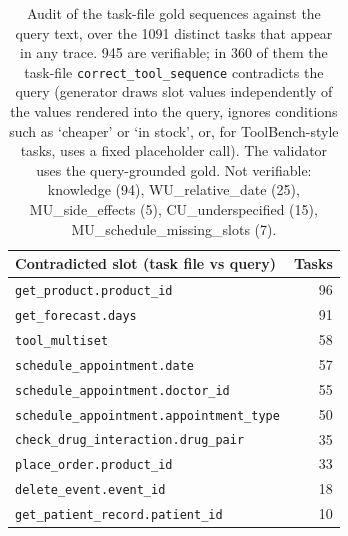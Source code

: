 \begin{table}[t]
\centering
\caption{Audit of the task-file gold sequences against the query text, over the 1091 distinct tasks
that appear in any trace. 945 are verifiable; in 360
of them the task-file \texttt{correct\_tool\_sequence} contradicts the query (generator draws slot values independently
of the values rendered into the query, ignores conditions such as `cheaper' or `in stock', or, for ToolBench-style
tasks, uses a fixed placeholder call). The validator uses the query-grounded gold. Not verifiable:
knowledge (94), WU\_relative\_date (25), MU\_side\_effects (5), CU\_underspecified (15), MU\_schedule\_missing\_slots (7).}
\label{tab:gold-audit}
\small
\begin{tabular}{@{}lr@{}}
\toprule
Contradicted slot (task file vs query) & Tasks \\
\midrule
\texttt{get\_product.product\_id} & 96 \\
\texttt{get\_forecast.days} & 91 \\
\texttt{tool\_multiset} & 58 \\
\texttt{schedule\_appointment.date} & 57 \\
\texttt{schedule\_appointment.doctor\_id} & 55 \\
\texttt{schedule\_appointment.appointment\_type} & 50 \\
\texttt{check\_drug\_interaction.drug\_pair} & 35 \\
\texttt{place\_order.product\_id} & 33 \\
\texttt{delete\_event.event\_id} & 18 \\
\texttt{get\_patient\_record.patient\_id} & 10 \\
\bottomrule
\end{tabular}
\end{table}
